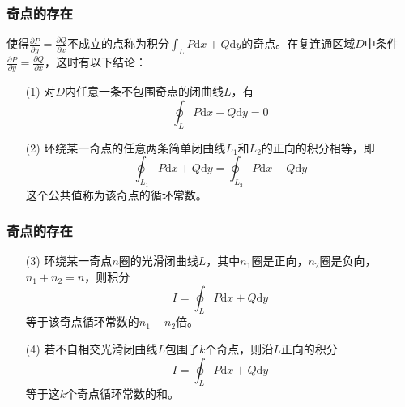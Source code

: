 \documentclass[xetex]{beamer}
\begin{document}
	\begin{frame}
		\frametitle{奇点的存在}
		使得$\frac{\partial P}{\partial y} = \frac{\partial Q}{\partial x}$不成立的点称为积分$\int_L P\mathrm{d}x + Q\mathrm{d}y$的奇点。在复连通区域$D$中条件$\frac{\partial P}{\partial y} = \frac{\partial Q}{\partial x}$，这时有以下结论：
		\begin{itemize}
			\item[(1)]对$D$内任意一条不包围奇点的闭曲线$L$，有
				\begin{equation*}
					\oint_L P\mathrm{d}x + Q\mathrm{d}y = 0
				\end{equation*}
			\item[(2)] 环绕某一奇点的任意两条简单闭曲线$L_1$和$L_2$的正向的积分相等，即
				\begin{equation*}
					\oint_{L_1} P\mathrm{d}x + Q\mathrm{d}y = \oint_{L_2} P\mathrm{d}x + Q\mathrm{d}y
				\end{equation*}
				这个公共值称为该奇点的循环常数。
		\end{itemize}
	\end{frame}
	\begin{frame}
		\frametitle{奇点的存在}
		\begin{itemize}
			\item[(3)]环绕某一奇点$n$圈的光滑闭曲线$L$，其中$n_1$圈是正向，$n_2$圈是负向，$n_1 + n_2 = n$，则积分
			\begin{equation*}
			I = \oint_L P\mathrm{d}x + Q\mathrm{d}y
			\end{equation*}
			等于该奇点循环常数的$n_1 - n_2$倍。
			\item[(4)]若不自相交光滑闭曲线$L$包围了$k$个奇点，则沿$L$正向的积分
			\begin{equation*}
			I = \oint_L P\mathrm{d}x + Q\mathrm{d}y
			\end{equation*}
			等于这$k$个奇点循环常数的和。
		\end{itemize}
	\end{frame}
\end{document}
